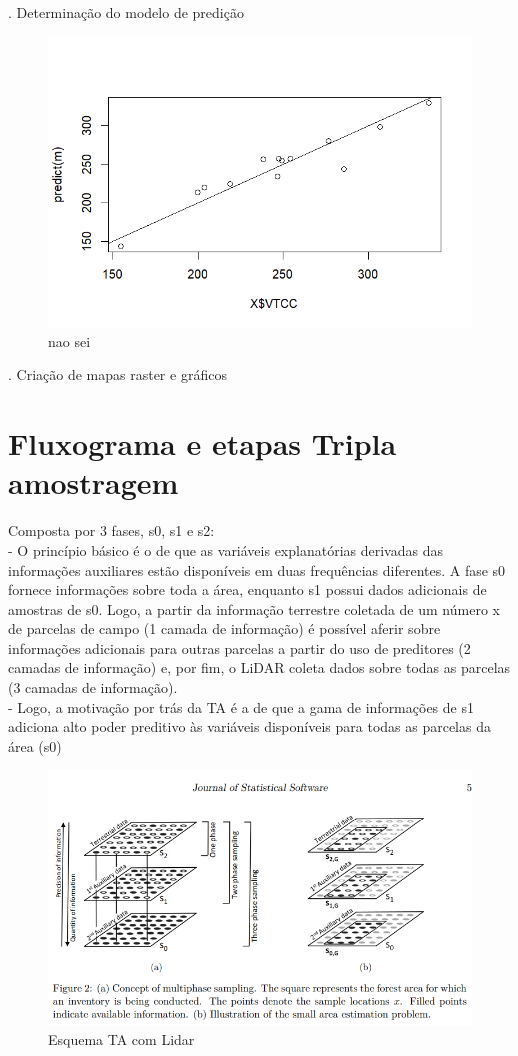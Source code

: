 \documentclass[
]{article}
\begin{document}
. Determinação do modelo de predição

\begin{figure}

{\centering \includegraphics[width=0.5\linewidth]{IMAGES/analise-de-regressao} 

}

\caption{nao sei}\label{fig:unnamed-chunk-18}
\end{figure}

. Criação de mapas raster e gráficos \newpage

\section{Fluxograma e etapas Tripla
amostragem}\label{fluxograma-e-etapas-tripla-amostragem}

Composta por 3 fases, s0, s1 e s2:\\
- O princípio básico é o de que as variáveis explanatórias derivadas das
informações auxiliares estão disponíveis em duas frequências diferentes.
A fase s0 fornece informações sobre toda a área, enquanto s1 possui
dados adicionais de amostras de s0. Logo, a partir da informação
terrestre coletada de um número x de parcelas de campo (1 camada de
informação) é possível aferir sobre informações adicionais para outras
parcelas a partir do uso de preditores (2 camadas de informação) e, por
fim, o LiDAR coleta dados sobre todas as parcelas (3 camadas de
informação).\\
- Logo, a motivação por trás da TA é a de que a gama de informações de
s1 adiciona alto poder preditivo às variáveis disponíveis para todas as
parcelas da área (s0)

\begin{figure}

{\centering \includegraphics[width=0.5\linewidth]{IMAGES/esquematizacao-TA} 

}

\caption{Esquema TA com Lidar}\label{fig:unnamed-chunk-19}
\end{figure}
\end{document}
